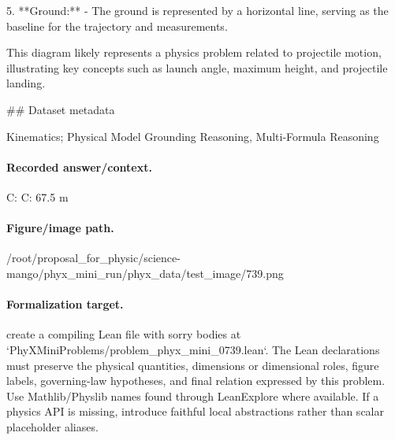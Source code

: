 5. **Ground:**
   - The ground is represented by a horizontal line, serving as the baseline for the trajectory and measurements.

This diagram likely represents a physics problem related to projectile motion, illustrating key concepts such as launch angle, maximum height, and projectile landing.

\#\# Dataset metadata

Kinematics; Physical Model Grounding Reasoning, Multi-Formula Reasoning

\paragraph{Recorded answer/context.}
C: C: 67.5 m

\paragraph{Figure/image path.}
/root/proposal\_for\_physic/science-mango/phyx\_mini\_run/phyx\_data/test\_image/739.png

\paragraph{Formalization target.}
create a compiling Lean file with sorry bodies at `PhyXMiniProblems/problem\_phyx\_mini\_0739.lean`. The Lean declarations must preserve the physical quantities, dimensions or dimensional roles, figure labels, governing-law hypotheses, and final relation expressed by this problem.
Use Mathlib/Physlib names found through LeanExplore where available. If a physics API is missing, introduce faithful local abstractions rather than scalar placeholder aliases.

